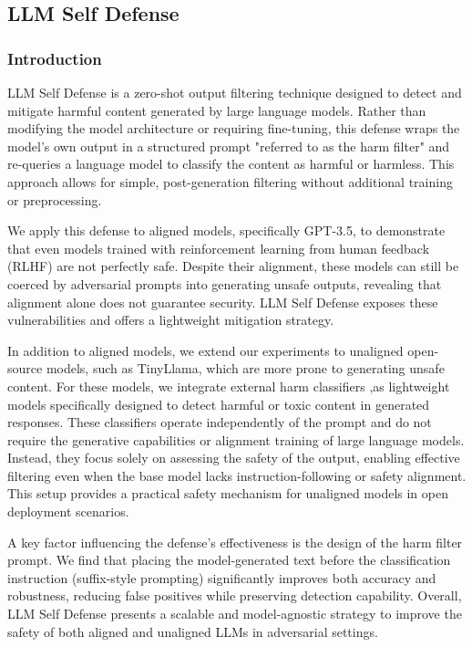\documentclass[../main.tex]{subfiles}
\begin{document}
\clearpage


\subsection{LLM Self Defense}
\subsubsection{Introduction}

LLM Self Defense is a zero-shot output filtering technique designed to detect and mitigate harmful content generated by large language models. Rather than modifying the model architecture or requiring fine-tuning, this defense wraps the model’s own output in a structured prompt "referred to as the harm filter" and re-queries a language model to classify the content as harmful or harmless. This approach allows for simple, post-generation filtering without additional training or preprocessing.

We apply this defense to aligned models, specifically GPT-3.5, to demonstrate that even models trained with reinforcement learning from human feedback (RLHF) are not perfectly safe. Despite their alignment, these models can still be coerced by adversarial prompts into generating unsafe outputs, revealing that alignment alone does not guarantee security. LLM Self Defense exposes these vulnerabilities and offers a lightweight mitigation strategy.

In addition to aligned models, we extend our experiments to unaligned open-source models, such as TinyLlama, which are more prone to generating unsafe content. For these models, we integrate external harm classifiers ,as lightweight models specifically designed to detect harmful or toxic content in generated responses. These classifiers operate independently of the prompt and do not require the generative capabilities or alignment training of large language models. Instead, they focus solely on assessing the safety of the output, enabling effective filtering even when the base model lacks instruction-following or safety alignment. This setup provides a practical safety mechanism for unaligned models in open deployment scenarios.



A key factor influencing the defense’s effectiveness is the design of the harm filter prompt. We find that placing the model-generated text before the classification instruction (suffix-style prompting) significantly improves both accuracy and robustness, reducing false positives while preserving detection capability. Overall, LLM Self Defense presents a scalable and model-agnostic strategy to improve the safety of both aligned and unaligned LLMs in adversarial settings.
\cite{phute2024llmselfdefense}
\end{document}
